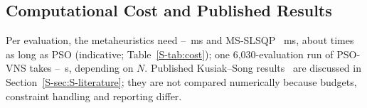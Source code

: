 \subsection{Computational Cost and Published Results}
\label{sec:literature}
\label{sec:runtime}
Per evaluation, the metaheuristics need \NMsEvalMin--\NMsEvalMax~ms and MS-SLSQP \NMsEvalSLSQP~ms, about \NSLSQPSlowdown{} times as long as PSO (indicative; Table~\ref{S-tab:cost}); one 6,030-evaluation run of PSO-VNS takes \NSecPerRunMin--\NSecPerRunMax~s, depending on $N$. Published Kusiak--Song results~\cite{Kusiak2010,Eroglu2012,Eroglu2013,Bansal2017} are discussed in Section~\ref{S-sec:S-literature}; they are not compared numerically because budgets, constraint handling and reporting differ.
